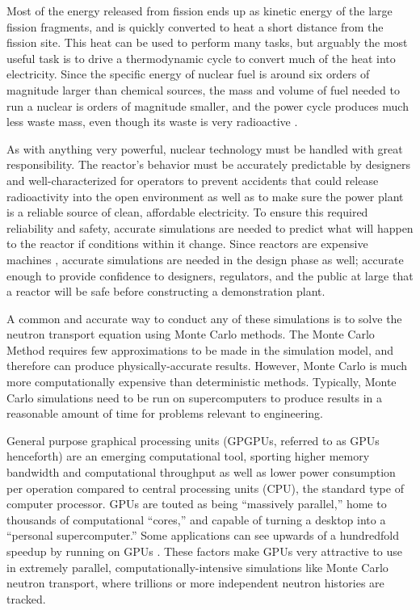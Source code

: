 Most of the energy released from fission ends up as kinetic energy of the large fission fragments, and is quickly converted to heat a short distance from the fission site.  This heat can be used to perform many tasks, but arguably the most useful task is to drive a thermodynamic cycle to convert much of the heat into electricity.  Since the specific energy of nuclear fuel is around six orders of magnitude larger than chemical sources, the mass and volume of fuel needed to run a nuclear is orders of magnitude smaller, and the power cycle produces much less waste mass, even though its waste is very radioactive \cite{waste_mass}.  

As with anything very powerful, nuclear technology must be handled with great responsibility.  The reactor's behavior must be accurately predictable by designers and well-characterized for operators to prevent accidents that could release radioactivity into the open environment as well as to make sure the power plant is a reliable source of clean, affordable electricity.  To ensure this required reliability and safety, accurate simulations are needed to predict what will happen to the reactor if conditions within it change.  Since reactors are  expensive machines \cite{nuclear_cost}, accurate simulations are needed in the design phase as well; accurate enough to provide confidence to designers, regulators, and the public at large that a reactor will be safe before constructing a demonstration plant.  

A common and accurate way to conduct any of these simulations is to solve the neutron transport equation using Monte Carlo methods.  The Monte Carlo Method requires few approximations to be made in the simulation model, and therefore can produce physically-accurate results.  However, Monte Carlo is much more computationally expensive than deterministic methods.  Typically, Monte Carlo simulations need to be run on supercomputers to produce results in a reasonable amount of time for problems relevant to engineering.

General purpose graphical processing units (GPGPUs, referred to as GPUs henceforth) are an emerging computational tool, sporting higher memory bandwidth and computational throughput as well as lower power consumption per operation compared to central processing units (CPU), the standard type of computer processor.  GPUs are touted as being ``massively parallel,'' home to thousands of computational ``cores,'' and capable of turning a desktop into a ``personal supercomputer.''  Some applications can see upwards of a hundredfold speedup by running on GPUs \cite{nvidia_speedups}. These factors make GPUs very attractive to use in extremely parallel, computationally-intensive simulations like Monte Carlo neutron transport, where trillions or more independent neutron histories are tracked.   

